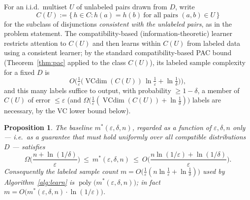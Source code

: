 \documentclass{amsart}
\newtheorem{proposition}{Proposition}
\theoremstyle{definition}
\theoremstyle{remark}
\newcommand{\eps}{\varepsilon}
\DeclareMathOperator{\VCdim}{VCdim}
\DeclareMathOperator{\poly}{poly}
\begin{document}
For an i.i.d.\ multiset $U$ of unlabeled pairs drawn from $D$, write
\[
C(U):=\big\{\,h\in C : h(a)=h(b)\ \text{for all pairs } (a,b)\in U\,\big\}
\]
for the subclass of disjunctions \emph{consistent with the unlabeled pairs}, as
in the problem statement. The compatibility-based (information-theoretic)
learner restricts attention to $C(U)$ and then learns within $C(U)$ from labeled
data using a consistent learner; by the standard compatibility-based PAC bound
(Theorem~\ref{thm:pac} applied to the class $C(U)$), its labeled sample
complexity for a fixed $D$ is
\begin{equation}\label{eq:perD}
O\!\Big(\tfrac1\eps\big(\VCdim(C(U))\,\ln\tfrac1\eps+\ln\tfrac1\delta\big)\Big),
\end{equation}
and this many labels suffice to output, with probability $\ge1-\delta$, a member
of $C(U)$ of error $\le\eps$ (and
$\Omega\big(\tfrac1\eps(\VCdim(C(U))+\ln\tfrac1\delta)\big)$ labels are necessary,
by the VC lower bound below).

\begin{proposition}\label{prop:mstar}
The baseline $m^*(\eps,\delta,n)$, regarded as a function of $\eps,\delta,n$
only --- i.e.\ as a guarantee that must hold uniformly over all compatible
distributions $D$ --- satisfies
\[
\Omega\!\Big(\frac{n+\ln(1/\delta)}{\eps}\Big)\ \le\ m^*(\eps,\delta,n)\ \le\
O\!\Big(\frac{n\ln(1/\eps)+\ln(1/\delta)}{\eps}\Big).
\]
Consequently the labeled sample count
$m=O\big(\tfrac1\eps(n\ln\tfrac1\eps+\ln\tfrac1\delta)\big)$ used by
Algorithm~\ref{alg:learn} is $\poly\big(m^*(\eps,\delta,n)\big)$; in fact
$m=O\big(m^*(\eps,\delta,n)\cdot\ln(1/\eps)\big)$.
\end{proposition}
\end{document}
